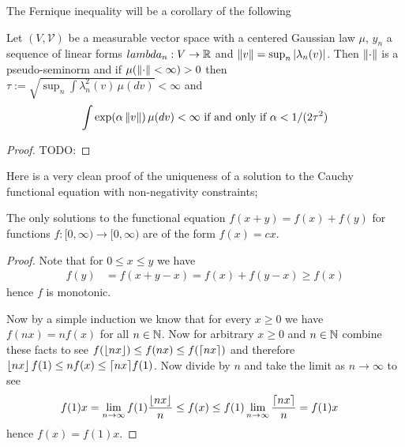 The Fernique inequality will be a corollary of the following
\begin{thm}Let $(V, \mathcal{V})$ be a measurable vector space with a centered Gaussian law $\mu$, $y_n$ a sequence of linear forms $lambda_n : V \to \mathbb{R}$ and $\left \lVert v \right \rVert = \sup_{n} \left \vert \lambda_n(v) \right \vert$.  Then $\left \lVert \cdot \right \rVert$ is a pseudo-seminorm and if $\mu(\left \lVert \cdot \right \rVert < \infty) > 0$ then $\tau := \sqrt{\sup_n \int \lambda_n^2(v) \, \mu(dv)} < \infty$ and 
\begin{align*}
\int \exp(\alpha \left \lVert v \right \rVert) \, \mu(dv) < \infty \text{ if and only if $\alpha < 1/(2\tau^2)$}
\end{align*}
\end{thm}
\begin{proof}
TODO:
\end{proof}

Here is a very clean proof of the uniqueness of a solution to the Cauchy functional equation with non-negativity constraints;
\begin{prop}The only solutions to the functional equation $f(x+y) = f(x) + f(y)$ for functions $f : [0,\infty) \to [0, \infty)$ are of the form  $f(x) = cx$.
\end{prop}
\begin{proof}
Note that for $0 \leq x \leq y$ we have 
\begin{align*}
f(y) &= f(x + y - x) = f(x) + f(y-x) \geq f(x)
\end{align*}
hence $f$ is monotonic.  

Now by a simple induction we know that for every $x \geq 0$ we have $f(nx) = nf(x)$ for all $n \in\mathbb{N}$.  Now for arbitrary $x \geq 0$ and $n \in \mathbb{N}$ combine these facts to see
$f(\left \lfloor nx \right \rfloor) \leq f(nx) \leq f(\lceil nx \rceil)$ and therefore $\left \lfloor nx \right \rfloor f(1) \leq n f(x) \leq \lceil nx \rceil f(1)$.  Now divide by $n$ and take the limit as $n \to \infty$ to see
\begin{align*}
f(1) x &= \lim_{n \to \infty} f(1)\frac{\left \lfloor nx \right \rfloor}{n} \leq f(x) \leq f(1) \lim_{n \to \infty} \frac{\lceil nx \rceil}{n} = f(1) x
\end{align*}
hence $f(x) = f(1) x$.
\end{proof}

